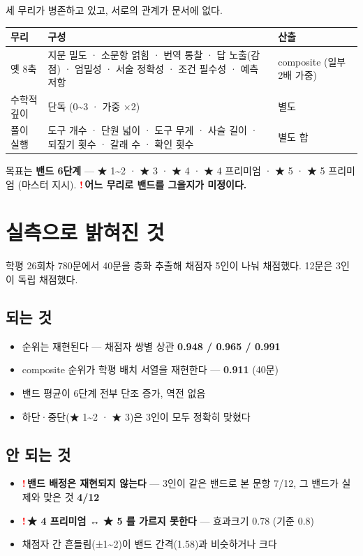 \documentclass[11pt]{article}
\newcommand{\R}{\textcolor{red}{\textbf{!}}\,}
\begin{document}
세 무리가 병존하고 있고, 서로의 관계가 문서에 없다.

\begin{center}
\begin{tabular}{@{}p{32mm}p{68mm}p{50mm}@{}}
\toprule
\textbf{무리} & \textbf{구성} & \textbf{산출} \\
\midrule
옛 8축 & 지문 밀도 · 소문항 얽힘 · 번역 통찰 · 답 노출(감점) · 엄밀성 · 서술 정확성 · 조건 필수성 · 예측 저항 & composite (일부 2배 가중) \\
수학적 깊이 & 단독 (0\textasciitilde3 · 가중 ×2) & 별도 \\
풀이 실행 & 도구 개수 · 단원 넓이 · 도구 무게 · 사슬 길이 · 되짚기 횟수 · 갈래 수 · 확인 횟수 & 별도 합 \\
\bottomrule
\end{tabular}
\end{center}

\vspace{2mm}
목표는 \textbf{밴드 6단계} — ★ 1\textasciitilde2 · ★ 3 · ★ 4 · ★ 4 프리미엄 · ★ 5 · ★ 5 프리미엄
(마스터 지시). \R \textbf{어느 무리로 밴드를 그을지가 미정이다.}

\section{실측으로 밝혀진 것}

학평 26회차 780문에서 40문을 층화 추출해 채점자 5인이 나눠 채점했다. 12문은 3인이 독립 채점했다.

\subsection{되는 것}
\begin{itemize}
\item 순위는 재현된다 — 채점자 쌍별 상관 \textbf{0.948 / 0.965 / 0.991}
\item composite 순위가 학평 배치 서열을 재현한다 — \textbf{0.911} (40문)
\item 밴드 평균이 6단계 전부 단조 증가, 역전 없음
\item 하단·중단(★ 1\textasciitilde2 · ★ 3)은 3인이 모두 정확히 맞혔다
\end{itemize}

\subsection{안 되는 것}
\begin{itemize}
\item \R \textbf{밴드 배정은 재현되지 않는다} — 3인이 같은 밴드로 본 문항 7/12,
그 밴드가 실제와 맞은 것 \textbf{4/12}
\item \R \textbf{★ 4 프리미엄 ↔ ★ 5 를 가르지 못한다} — 효과크기 0.78 (기준 0.8)
\item 채점자 간 흔들림(±1\textasciitilde2)이 밴드 간격(1.58)과 비슷하거나 크다
\end{itemize}
\end{document}
